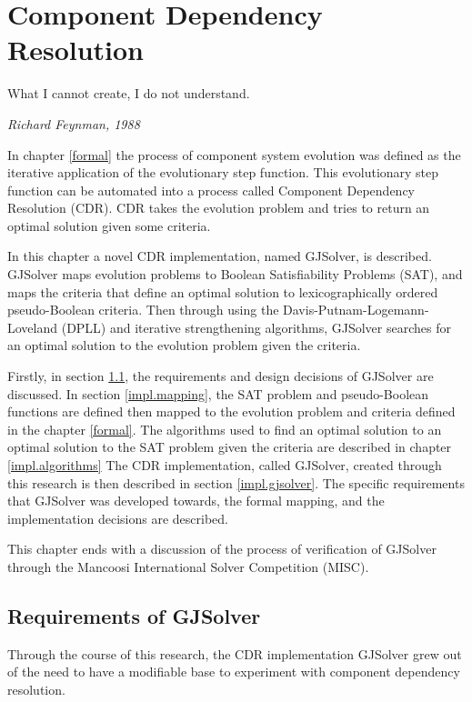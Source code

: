 \chapter{Component Dependency Resolution}
\label{implementation}
\epigraph{What I cannot create, I do not understand.}
{\textit{Richard Feynman, 1988}}

In chapter \ref{formal} the process of component system evolution was defined as the iterative application of the evolutionary step function.
This evolutionary step function can be automated into a process called Component Dependency Resolution (CDR).
CDR takes the evolution problem and tries to return an optimal solution given some criteria.

In this chapter a novel CDR implementation, named GJSolver, is described.
GJSolver maps evolution problems to Boolean Satisfiability Problems (SAT),
and maps the criteria that define an optimal solution to lexicographically ordered pseudo-Boolean \citep{dixon2004automating} criteria. 
Then through using the Davis-Putnam-Logemann-Loveland (DPLL) \citep{Davis1960, davis1962machine}
and iterative strengthening \citep{calistri1994iterative, le2010sat4j} algorithms,
GJSolver searches for an optimal solution to the evolution problem given the criteria.

Firstly, in section \ref{impl.requirement}, the requirements and design decisions of GJSolver are discussed.
In section \ref{impl.mapping}, the SAT problem and pseudo-Boolean functions are defined then mapped to the evolution problem and criteria defined in the chapter \ref{formal}.
The algorithms used to find an optimal solution to an optimal solution to the SAT problem given the criteria are described in chapter \ref{impl.algorithms}
The CDR implementation, called GJSolver, created through this research is then described in section \ref{impl.gjsolver}.
The specific requirements that GJSolver was developed towards, the formal mapping, and the implementation decisions are described.

This chapter ends with a discussion of the process of verification of GJSolver through the Mancoosi International Solver Competition (MISC).  

\section{Requirements of GJSolver}
\label{impl.requirement}
Through the course of this research, the CDR implementation GJSolver grew out of the need to have a modifiable base to experiment with component dependency resolution.

